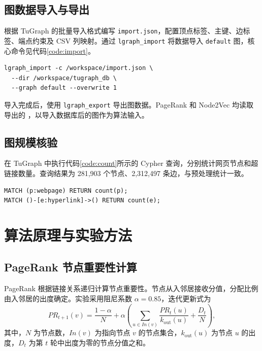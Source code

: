 \documentclass[UTF8,a4paper,12pt,fontset=windows]{ctexart}
\begin{document}
\subsection{图数据导入与导出}
根据 TuGraph 的批量导入格式\cite{tugraph}编写 \texttt{import.json}，配置顶点标签、主键、边标签、端点约束及 CSV 列映射。通过 \texttt{lgraph\_import} 将数据导入 \texttt{default} 图，核心命令见代码\ref{code:import}。

\par\noindent\begin{minipage}{\linewidth}
\begin{lstlisting}[caption={TuGraph 批量导入命令},label={code:import}]
lgraph_import -c /workspace/import.json \
  --dir /workspace/tugraph_db \
  --graph default --overwrite 1
\end{lstlisting}
\end{minipage}\par

导入完成后，使用 \texttt{lgraph\_export} 导出图数据。PageRank 和 Node2Vec 均读取导出的 ，以导入数据库后的图作为算法输入。

\subsection{图规模核验}
在 TuGraph 中执行代码\ref{code:count}所示的 Cypher 查询，分别统计网页节点和超链接数量。查询结果为 281,903 个节点、2,312,497 条边，与预处理统计一致。

\par\noindent\begin{minipage}{\linewidth}
\begin{lstlisting}[caption={节点与边数量查询},label={code:count}]
MATCH (p:webpage) RETURN count(p);
MATCH ()-[e:hyperlink]->() RETURN count(e);
\end{lstlisting}
\end{minipage}\par

\section{算法原理与实验方法}
\subsection{PageRank 节点重要性计算}
PageRank 根据链接关系递归计算节点重要性。节点从入邻居接收分值，分配比例由入邻居的出度确定。实验采用阻尼系数 $\alpha=0.85$，迭代更新式为
\begin{equation}\label{eq:pr}
PR_{t+1}(v)=\frac{1-\alpha}{N}+\alpha\left(\sum_{u\in In(v)}\frac{PR_t(u)}{k_{\mathrm{out}}(u)}+\frac{D_t}{N}\right),
\end{equation}
其中，$N$ 为节点数，$In(v)$ 为指向节点 $v$ 的节点集合，$k_{\mathrm{out}}(u)$ 为节点 $u$ 的出度，$D_t$ 为第 $t$ 轮中出度为零的节点分值之和。
\end{document}
